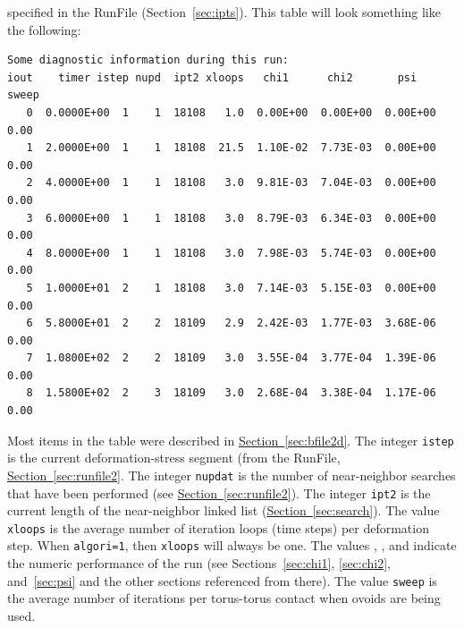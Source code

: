 \documentclass[letterpaper,11pt]{article}
\begin{document}
specified in the \textsf{RunFile} (Section~\ref{sec:ipts}).
This table will look something like the following:
\par
\footnotesize
\label{verb:screen2}
\begin{verbatim}
Some diagnostic information during this run:
iout    timer istep nupd  ipt2 xloops   chi1      chi2       psi    sweep
   0  0.0000E+00  1    1  18108   1.0  0.00E+00  0.00E+00  0.00E+00  0.00
   1  2.0000E+00  1    1  18108  21.5  1.10E-02  7.73E-03  0.00E+00  0.00
   2  4.0000E+00  1    1  18108   3.0  9.81E-03  7.04E-03  0.00E+00  0.00
   3  6.0000E+00  1    1  18108   3.0  8.79E-03  6.34E-03  0.00E+00  0.00
   4  8.0000E+00  1    1  18108   3.0  7.98E-03  5.74E-03  0.00E+00  0.00
   5  1.0000E+01  2    1  18108   3.0  7.14E-03  5.15E-03  0.00E+00  0.00
   6  5.8000E+01  2    2  18109   2.9  2.42E-03  1.77E-03  3.68E-06  0.00
   7  1.0800E+02  2    2  18109   3.0  3.55E-04  3.77E-04  1.39E-06  0.00
   8  1.5800E+02  2    3  18109   3.0  2.68E-04  3.38E-04  1.17E-06  0.00
\end{verbatim}
\normalsize
Most items in the table were described in
\hyperref[sec:bfile2d]{Section~\ref*{sec:bfile2d}}.
The integer \texttt{istep} is the current
deformation-stress segment
(from the \textsf{RunFile},
\hyperref[sec:runfile2]{Section~\ref*{sec:runfile2}}.
The integer \texttt{nupdat} is the number of near-neighbor searches that
have been performed
(see \hyperref[sec:runfile2]{Section~\ref*{sec:runfile2}}).
The integer \texttt{ipt2} is the current length of the near-neighbor
linked list
(\hyperref[sec:search]{Section~\ref*{sec:search}}).
The value \texttt{xloops} is the average number of iteration loops
(time steps) per deformation step.  When \texttt{algori=1}, then
\texttt{xloops} will always be one.
The values \texttt{}, \texttt{}, and \texttt{} indicate the 
numeric performance of the run
(see Sections~\hyperref[sec:chi1]{\ref*{sec:chi1}},
\hyperref[sec:chi2]{\ref*{sec:chi2}},
and~\hyperref[sec:psi]{\ref*{sec:psi}}
and the other sections referenced from there).
The value \texttt{sweep} is the average number of iterations per
torus-torus contact when ovoids are being used.
%
%
\end{document}
